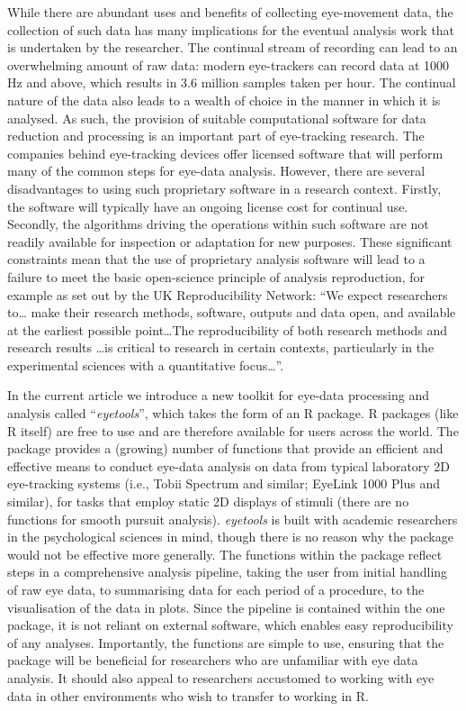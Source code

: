 \documentclass[
  man,
  floatsintext,
  longtable,
  nolmodern,
  notxfonts,
  notimes,
  colorlinks=true,linkcolor=blue,citecolor=blue,urlcolor=blue]{apa7}
\begin{document}
While there are abundant uses and benefits of collecting eye-movement
data, the collection of such data has many implications for the eventual
analysis work that is undertaken by the researcher. The continual stream
of recording can lead to an overwhelming amount of raw data: modern
eye-trackers can record data at 1000 Hz and above, which results in 3.6
million samples taken per hour. The continual nature of the data also
leads to a wealth of choice in the manner in which it is analysed. As
such, the provision of suitable computational software for data
reduction and processing is an important part of eye-tracking research.
The companies behind eye-tracking devices offer licensed software that
will perform many of the common steps for eye-data analysis. However,
there are several disadvantages to using such proprietary software in a
research context. Firstly, the software will typically have an ongoing
license cost for continual use. Secondly, the algorithms driving the
operations within such software are not readily available for inspection
or adaptation for new purposes. These significant constraints mean that
the use of proprietary analysis software will lead to a failure to meet
the basic open-science principle of analysis reproduction, for example
as set out by the UK Reproducibility Network: ``We expect researchers
to\ldots{} make their research methods, software, outputs and data open,
and available at the earliest possible point\ldots The reproducibility
of both research methods and research results \ldots is critical to
research in certain contexts, particularly in the experimental sciences
with a quantitative focus\ldots{}''.

In the current article we introduce a new toolkit for eye-data
processing and analysis called ``\emph{eyetools}'', which takes the form
of an R package. R packages (like R itself) are free to use and are
therefore available for users across the world. The package provides a
(growing) number of functions that provide an efficient and effective
means to conduct eye-data analysis on data from typical laboratory 2D
eye-tracking systems (i.e., Tobii Spectrum and similar; EyeLink 1000
Plus and similar), for tasks that employ static 2D displays of stimuli
(there are no functions for smooth pursuit analysis). \emph{eyetools} is
built with academic researchers in the psychological sciences in mind,
though there is no reason why the package would not be effective more
generally. The functions within the package reflect steps in a
comprehensive analysis pipeline, taking the user from initial handling
of raw eye data, to summarising data for each period of a procedure, to
the visualisation of the data in plots. Since the pipeline is contained
within the one package, it is not reliant on external software, which
enables easy reproducibility of any analyses. Importantly, the functions
are simple to use, ensuring that the package will be beneficial for
researchers who are unfamiliar with eye data analysis. It should also
appeal to researchers accustomed to working with eye data in other
environments who wish to transfer to working in R.
\end{document}
